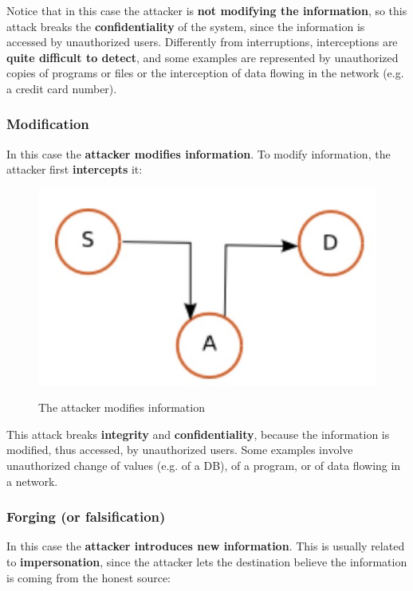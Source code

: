 Notice that in this case the attacker is \textbf{not modifying the information}, so this attack breaks the \textbf{confidentiality} of the system, since the information is accessed by unauthorized users. Differently from interruptions, interceptions are \textbf{quite difficult to detect}, and some examples are represented by unauthorized copies of programs or files or the interception of data flowing in the network (e.g. a credit card number).

\subsubsection{Modification}
In this case the \textbf{attacker modifies information}. To modify information, the attacker first \textbf{intercepts} it:

\begin{figure}[h!]
    \centering
    \includegraphics[scale = 0.7]{img/sec3.jpg}
    \label{sec3}
    \caption{The attacker modifies information}
\end{figure}

This attack breaks \textbf{integrity} and \textbf{confidentiality}, because the information is modified, thus accessed, by unauthorized users. Some examples involve unauthorized change of values (e.g. of a DB), of a program, or of data flowing in a network.

\subsubsection{Forging (or falsification)}
In this case the \textbf{attacker introduces new information}. This is usually related to \textbf{impersonation}, since the attacker lets the destination believe the information is coming from the honest source:

